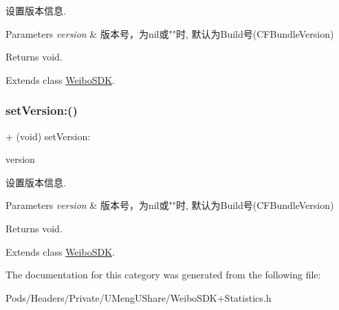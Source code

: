 设置版本信息. 
\begin{DoxyParams}{Parameters}
{\em version} & 版本号，为nil或""时, 默认为\+Build号(\+C\+F\+Bundle\+Version) \\
\hline
\end{DoxyParams}
\begin{DoxyReturn}{Returns}
void. 
\end{DoxyReturn}


Extends class \mbox{\hyperlink{interface_weibo_s_d_k_ac68e6c65a10fa6c5f04c1293050a7127}{Weibo\+S\+DK}}.

\mbox{\label{category_weibo_s_d_k_07_statistics_08_ac68e6c65a10fa6c5f04c1293050a7127}} 
\subsubsection{\texorpdfstring{set\+Version\+:()}{setVersion:()}\hspace{0.1cm}{\footnotesize\ttfamily [3/3]}}
{\footnotesize\ttfamily + (void) set\+Version\+: \begin{DoxyParamCaption}\item[{(N\+S\+String $\ast$)}]{version }\end{DoxyParamCaption}}

设置版本信息. 
\begin{DoxyParams}{Parameters}
{\em version} & 版本号，为nil或""时, 默认为\+Build号(\+C\+F\+Bundle\+Version) \\
\hline
\end{DoxyParams}
\begin{DoxyReturn}{Returns}
void. 
\end{DoxyReturn}


Extends class \mbox{\hyperlink{interface_weibo_s_d_k_ac68e6c65a10fa6c5f04c1293050a7127}{Weibo\+S\+DK}}.



The documentation for this category was generated from the following file\+:\begin{DoxyCompactItemize}
\item 
Pods/\+Headers/\+Private/\+U\+Meng\+U\+Share/Weibo\+S\+D\+K+\+Statistics.\+h\end{DoxyCompactItemize}
